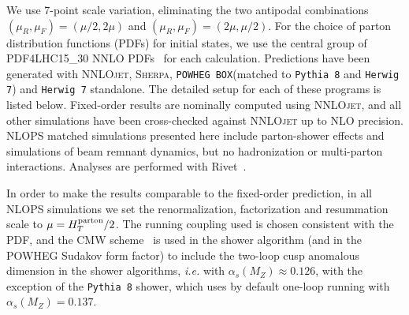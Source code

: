 \documentclass[10pt,prd,fleqn,superscriptaddress,notitlepage,nofootinbib,preprintnumbers,nobalancelastpage]{revtex4-1}
\newcommand{\NNLOJET}{\textsc{NNLOjet}\xspace}
\newcommand{\PWG}{\texttt{POWHEG BOX}\xspace}
\newcommand{\PY}{\texttt{Pythia 8}\xspace}
\newcommand{\HW}{\texttt{Herwig 7}\xspace}
\newcommand{\Sherpa}{\textsc{Sherpa}\xspace}
\begin{document}
We use 7-point scale variation, eliminating the two antipodal combinations $(\mu_R,\mu_F)=(\mu/2,2\mu)$ and $(\mu_R,\mu_F)=(2\mu,\mu/2)$. For the choice of parton distribution functions (PDFs) for initial states, we use the central group of PDF4LHC15\_30 NNLO PDFs~\cite{Butterworth:2015oua} for each calculation.
Predictions have been generated with \NNLOJET, \Sherpa, \PWG (matched to \PY and \HW) and \HW standalone. The detailed setup for each of these programs is listed below. Fixed-order results are nominally computed using \NNLOJET, and all other simulations have been cross-checked against \NNLOJET up to NLO precision.
NLOPS matched simulations presented here include parton-shower effects and simulations of beam remnant dynamics, but no hadronization or multi-parton interactions.
Analyses are performed with Rivet~\cite{Buckley:2010ar,Bierlich:2019rhm}.

In order to make the results comparable to the fixed-order prediction, in all NLOPS simulations we set the renormalization, factorization and resummation scale to $\mu=H_T^{\rm parton}/2$.
The running coupling used is chosen consistent with the PDF, and 
the CMW scheme~\cite{Catani:1990rr} is used in the shower algorithm (and in the POWHEG Sudakov form factor) to include the two-loop cusp anomalous dimension in the shower algorithms, \emph{i.e.} with $\alpha_s(M_Z)\approx0.126$, with the exception of the \PY shower, which uses by default one-loop running with $\alpha_s(M_Z)=0.137$.
\end{document}
